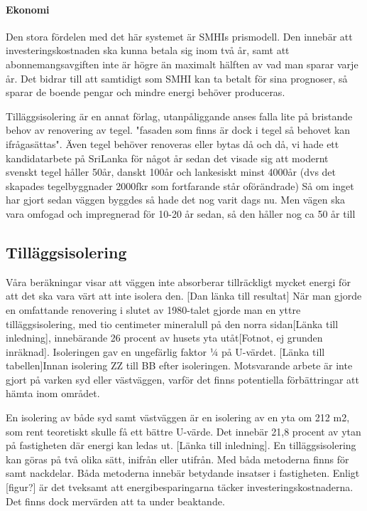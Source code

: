 \paragraph{Ekonomi}
Den stora fördelen med det här systemet är SMHIs prismodell. Den innebär att investeringskostnaden ska kunna betala sig inom två år, samt att abonnemangsavgiften inte är högre än maximalt hälften av vad man sparar varje år. Det bidrar till att samtidigt som SMHI kan ta betalt för sina prognoser, så sparar de boende pengar och mindre energi behöver produceras.


Tilläggsisolering är en annat förlag, utanpåliggande anses falla lite på bristande behov av renovering av tegel. "fasaden som finns är dock i tegel så behovet kan ifrågasättas". Även tegel behöver renoveras eller bytas då och då, vi hade ett kandidatarbete på SriLanka för något år sedan det visade sig att modernt svenskt tegel håller 50år, danskt 100år och lankesiskt minst 4000år (dvs det skapades 
tegelbyggnader 2000fkr som fortfarande står oförändrade) Så om inget har gjort sedan väggen byggdes så hade det nog varit dags nu. Men vägen ska vara omfogad och impregnerad för 10-20 år sedan, så den håller nog ca 50 år till 


\subsection{Tilläggsisolering}
Våra beräkningar visar att väggen inte absorberar tillräckligt mycket energi för att det ska vara värt att inte isolera den.  [Dan länka till resultat]
När man gjorde en omfattande renovering i slutet av 1980-talet gjorde man en yttre tilläggsisolering, med tio centimeter mineralull på den norra sidan[Länka till inledning], innebärande 26 procent av husets yta utåt[Fotnot, ej grunden inräknad]. Isoleringen gav en ungefärlig faktor ¼ på U-värdet. [Länka till tabellen]Innan isolering ZZ till BB efter isoleringen. Motsvarande arbete är inte gjort på varken syd eller västväggen, varför det finns potentiella förbättringar att hämta inom området.

En isolering av både syd samt västväggen är en isolering av en yta om 212 m2, som rent teoretiskt skulle få ett bättre U-värde. Det innebär 21,8 procent av ytan på fastigheten där energi kan ledas ut. [Länka till inledning].
En tilläggsisolering kan göras på två olika sätt, inifrån eller utifrån. Med båda metoderna finns för samt nackdelar. Båda metoderna innebär betydande insatser i fastigheten. Enligt [figur?]  är det tveksamt att energibesparingarna täcker investeringskostnaderna. Det finns dock mervärden att ta under beaktande. 


